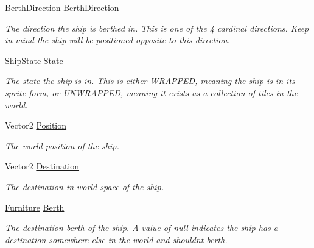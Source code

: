 \begin{DoxyCompactItemize}
\hyperlink{_ship_8cs_a7fa5743d14bde173fc53b46363f52a92}{Berth\+Direction} \hyperlink{class_ship_a73af2744eb79135baee7ed389cc1b2c7}{Berth\+Direction}
\begin{DoxyCompactList}\small\item\em The direction the ship is berthed in. This is one of the 4 cardinal directions. Keep in mind the ship will be positioned opposite to this direction. \end{DoxyCompactList}\item 
\hyperlink{_ship_8cs_a5cc8179225e5abfa75feab8d8b8d13e7}{Ship\+State} \hyperlink{class_ship_a1d15ce4feda27f6f176eedfe576acfe9}{State}
\begin{DoxyCompactList}\small\item\em The state the ship is in. This is either W\+R\+A\+P\+P\+ED, meaning the ship is in its sprite form, or U\+N\+W\+R\+A\+P\+P\+ED, meaning it exists as a collection of tiles in the world. \end{DoxyCompactList}\item 
Vector2 \hyperlink{class_ship_a462c6c91f5e90055823264eb4f451be8}{Position}
\begin{DoxyCompactList}\small\item\em The world position of the ship. \end{DoxyCompactList}\item 
Vector2 \hyperlink{class_ship_a799006d584ee78be4656c149a60babde}{Destination}
\begin{DoxyCompactList}\small\item\em The destination in world space of the ship. \end{DoxyCompactList}\item 
\hyperlink{class_furniture}{Furniture} \hyperlink{class_ship_ab8f3f2f2922059c0349d737b7dea5c13}{Berth}
\begin{DoxyCompactList}\small\item\em The destination berth of the ship. A value of null indicates the ship has a destination somewhere else in the world and shouldn\textquotesingle{}t berth. \end{DoxyCompactList}\end{DoxyCompactItemize}
